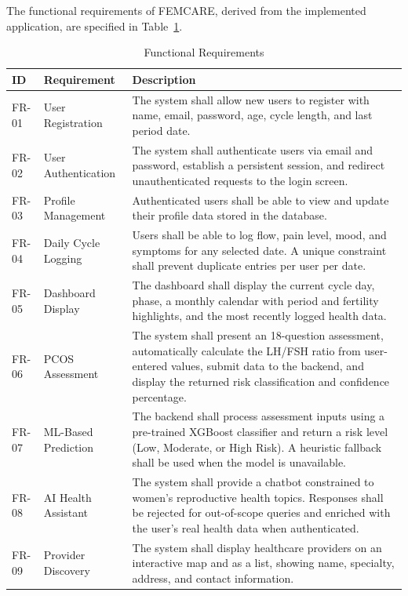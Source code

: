 The functional requirements of FEMCARE, derived from the implemented application, are specified in Table~\ref{tab:fr}.

\begin{table}[h!]
\centering
\caption{Functional Requirements}
\label{tab:fr}
\renewcommand{\arraystretch}{1.4}
\begin{tabular}{|p{1.2cm}|p{3.5cm}|p{8cm}|}
\hline
\rowcolor[HTML]{D9D9D9}
\textbf{ID} & \textbf{Requirement} & \textbf{Description} \\
\hline
FR-01 & User Registration & The system shall allow new users to register with name, email, password, age, cycle length, and last period date. \\
\hline
FR-02 & User Authentication & The system shall authenticate users via email and password, establish a persistent session, and redirect unauthenticated requests to the login screen. \\
\hline
FR-03 & Profile Management & Authenticated users shall be able to view and update their profile data stored in the database. \\
\hline
FR-04 & Daily Cycle Logging & Users shall be able to log flow, pain level, mood, and symptoms for any selected date. A unique constraint shall prevent duplicate entries per user per date. \\
\hline
FR-05 & Dashboard Display & The dashboard shall display the current cycle day, phase, a monthly calendar with period and fertility highlights, and the most recently logged health data. \\
\hline
FR-06 & PCOS Assessment & The system shall present an 18-question assessment, automatically calculate the LH/FSH ratio from user-entered values, submit data to the backend, and display the returned risk classification and confidence percentage. \\
\hline
FR-07 & ML-Based Prediction & The backend shall process assessment inputs using a pre-trained XGBoost classifier and return a risk level (Low, Moderate, or High Risk). A heuristic fallback shall be used when the model is unavailable. \\
\hline
FR-08 & AI Health Assistant & The system shall provide a chatbot constrained to women's reproductive health topics. Responses shall be rejected for out-of-scope queries and enriched with the user's real health data when authenticated. \\
\hline
FR-09 & Provider Discovery & The system shall display healthcare providers on an interactive map and as a list, showing name, specialty, address, and contact information. \\

\end{tabular}
\end{table}
